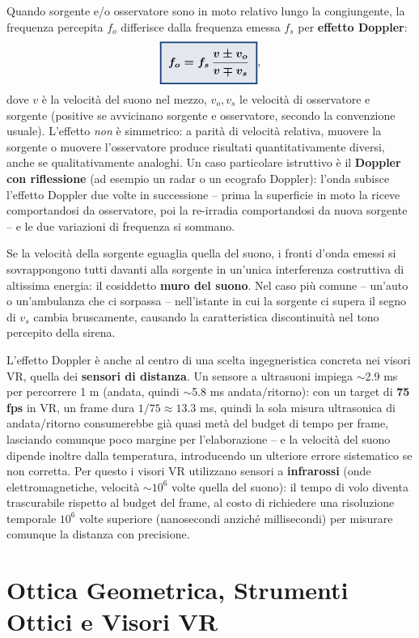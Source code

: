 \documentclass[a4paper,11pt]{article}
\newcommand{\keyeq}[1]{{\setlength{\fboxsep}{6pt}\setlength{\fboxrule}{1.3pt}\fcolorbox{chapblue}{chapblue!12}{\boldmath$\displaystyle #1$}}}
\begin{document}
Quando sorgente e/o osservatore sono in moto relativo lungo la congiungente, la frequenza percepita $f_o$ differisce dalla frequenza emessa $f_s$ per \textbf{effetto Doppler}:
\[
\keyeq{f_o = f_s\,\frac{v\pm v_o}{v\mp v_s}},
\]
dove $v$ è la velocità del suono nel mezzo, $v_o,v_s$ le velocità di osservatore e sorgente (positive se avvicinano sorgente e osservatore, secondo la convenzione usuale). L'effetto \emph{non} è simmetrico: a parità di velocità relativa, muovere la sorgente o muovere l'osservatore produce risultati quantitativamente diversi, anche se qualitativamente analoghi. Un caso particolare istruttivo è il \textbf{Doppler con riflessione} (ad esempio un radar o un ecografo Doppler): l'onda subisce l'effetto Doppler due volte in successione -- prima la superficie in moto la riceve comportandosi da osservatore, poi la re-irradia comportandosi da nuova sorgente -- e le due variazioni di frequenza si sommano.

Se la velocità della sorgente eguaglia quella del suono, i fronti d'onda emessi si sovrappongono tutti davanti alla sorgente in un'unica interferenza costruttiva di altissima energia: il cosiddetto \textbf{muro del suono}. Nel caso più comune -- un'auto o un'ambulanza che ci sorpassa -- nell'istante in cui la sorgente ci supera il segno di $v_s$ cambia bruscamente, causando la caratteristica discontinuità nel tono percepito della sirena.

L'effetto Doppler è anche al centro di una scelta ingegneristica concreta nei visori VR, quella dei \textbf{sensori di distanza}. Un sensore a ultrasuoni impiega $\sim$2.9 ms per percorrere 1 m (andata, quindi $\sim$5.8 ms andata/ritorno): con un target di \textbf{75 fps} in VR, un frame dura $1/75\approx13.3$ ms, quindi la sola misura ultrasonica di andata/ritorno consumerebbe già quasi metà del budget di tempo per frame, lasciando comunque poco margine per l'elaborazione -- e la velocità del suono dipende inoltre dalla temperatura, introducendo un ulteriore errore sistematico se non corretta. Per questo i visori VR utilizzano sensori a \textbf{infrarossi} (onde elettromagnetiche, velocità $\sim10^6$ volte quella del suono): il tempo di volo diventa trascurabile rispetto al budget del frame, al costo di richiedere una risoluzione temporale $10^6$ volte superiore (nanosecondi anziché millisecondi) per misurare comunque la distanza con precisione.

\newpage
\section{Ottica Geometrica, Strumenti Ottici e Visori VR}
\end{document}
